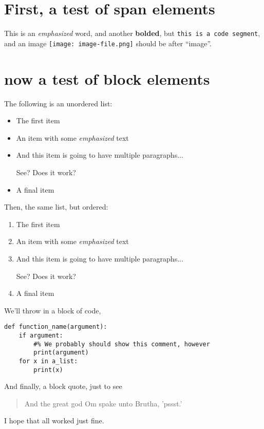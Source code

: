 \documentclass{article}
\begin{document}
\section{First, a test of span elements}
This is an \emph{emphasized} word, and another \textbf{bolded}, but \verb;this is a code segment;, and
an image \texttt{[image: image-file.png]} should be after ``image''.

\section{now a test of block elements}

The following is an unordered list:

\begin{itemize}
    \item The first item %
    \item An item with some \emph{emphasized} text
    \item And this item is going to have multiple paragraphs...

        See? Does it work?
    \item A final item
\end{itemize}

Then, the same list, but ordered:

\begin{enumerate}
    \item The first item
    \item An item with some \emph{emphasized} text
    \item And this item is going to have multiple paragraphs...

        See? Does it work?
    \item A final item
\end{enumerate}

We'll throw in a block of code,
\begin{verbatim}
def function_name(argument):
    if argument:
        #% We probably should show this comment, however
        print(argument)
    for x in a_list:
        print(x)
\end{verbatim}

And finally, a block quote, just to see
\begin{quote}
And the great god Om spake unto Brutha,
'pssst.'
\end{quote}

I hope that all worked just fine.
\end{document}
